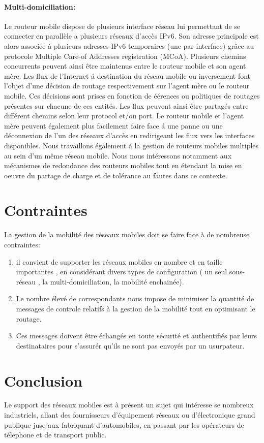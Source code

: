 \documentclass[12pt,a4paper]{report}
\begin{document}
\paragraph{Multi-domiciliation:} 
Le routeur mobile dispose de plusieurs interface r\'{e}seau lui permettant de se connecter en parall\`{e}le a plusieurs r\'{e}seaux d'acc\`{e}s IPv6. Son adresse principale est alors associ\'{e}e \`{a} plusieurs adresses IPv6 temporaires (une par interface) gr\^{a}ce au protocole Multiple Care-of Addresses registration (MCoA). Plusieurs chemins concurrents peuvent ainsi \^{e}tre maintenus entre le routeur mobile et son agent m\`{e}re.
Les flux de l'Internet \'{a} destination du r\'{e}seau mobile ou inversement font l'objet d'une d\'{e}cision de routage respectivement sur l'agent m\`{e}re ou le routeur mobile. Ces d\'{e}cisions sont prises en fonction de \'{e}\'{e}rences ou politiques de routages pr\'{e}sentes sur chacune de ces entit\'{e}s.
Les flux peuvent ainsi \^{e}tre partag\'{e}s entre diff\'{e}rent chemins selon leur protocol et/ou port. Le routeur mobile et l'agent m\`{e}re peuvent \'{e}galement plus facilement faire face \'{a} une panne ou une d\'{e}connexion de l'un des r\'{e}seaux d'acc\`{e}s en redirigeant les flux vers les interfaces disponibles.
Nous travaillons \'{e}galement \'{a} la gestion de routeurs mobiles multiples au sein d'un m\^{e}me r\'{e}seau mobile. Nous nous int\'{e}ressons notamment aux m\'{e}canismes de redondance des routeurs mobiles tout en \'{e}tendant la mise en oeuvre du partage de charge et de tol\'{e}rance au fautes dans ce contexte.

\newpage
\section{Contraintes}
La gestion de la mobilit\'e des r\'eseaux mobiles doit se faire face \`a de nombreuse contraintes:
\begin{enumerate}
  \item il convient de supporter les r\'eseaux mobiles en nombre et en taille importantes , en consid\'erant divers types de configuration ( un seul sous-r\'eseau , la multi-domiciliation, la mobilit\'e enchain\'ee).
  \item Le nombre \'elev\'e de correspondants nous impose de minimiser la quantit\'e de messages de controle relatifs \`a la gestion de la mobilit\'e tout en optimisant le routage.
  \item Ces messages doivent \^etre \'echang\'es en toute s\'ecurit\'e et authentifi\'es par leurs destinataires pour s'assur\'er qu'ils ne sont pas envoy\'es par un usurpateur. 
\end{enumerate}

\section{Conclusion}
Le support des r\'eseaux mobiles est \`a pr\'esent un sujet qui int\'eresse se nombreux industriels, allant des fournisseurs
 d'\'equipement r\'eseaux ou d'\'electronique grand publique jusq'aux fabriquant d'automobiles, en passant par les op\'erateurs de t\'elephone et de transport public.
\end{document}
